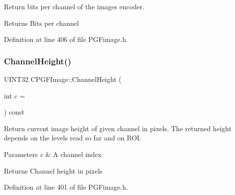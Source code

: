 Return bits per channel of the image\textquotesingle{}s encoder. \begin{DoxyReturn}{Returns}
Bits per channel 
\end{DoxyReturn}


Definition at line 406 of file P\+G\+Fimage.\+h.


\begin{DoxyCode}{0}

\end{DoxyCode}
\mbox{\label{classCPGFImage_a0e8b083f86199861e78334054c945863}} 
\subsubsection{\texorpdfstring{ChannelHeight()}{ChannelHeight()}}
{\footnotesize\ttfamily U\+I\+N\+T32 C\+P\+G\+F\+Image\+::\+Channel\+Height (\begin{DoxyParamCaption}\item[{int}]{c = {} }\end{DoxyParamCaption}) const\hspace{0.3cm}{\ttfamily [inline]}}

Return current image height of given channel in pixels. The returned height depends on the levels read so far and on R\+OI. 
\begin{DoxyParams}{Parameters}
{\em c} & A channel index \\
\hline
\end{DoxyParams}
\begin{DoxyReturn}{Returns}
Channel height in pixels 
\end{DoxyReturn}


Definition at line 401 of file P\+G\+Fimage.\+h.


\begin{DoxyCode}{0}

\end{DoxyCode}
\mbox{\label{classCPGFImage_af712acd16a3b00d55c03e355939086fc}} 
